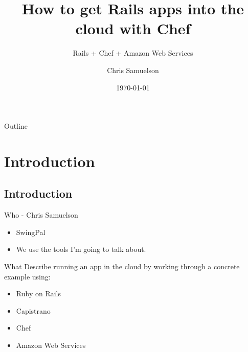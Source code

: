\documentclass{beamer}
\title %
{How to get Rails apps into the cloud with Chef}
\subtitle
{Rails + Chef + Amazon Web Services}
\author[@chrissamuelson] %
{Chris Samuelson}
\date %
{\today}
\begin{document}
\begin{frame}
  \titlepage
\end{frame}

\begin{frame}{Outline}
  \tableofcontents
\end{frame}





\section{Introduction}

\subsection{Introduction}

\begin{frame}{Who - Chris Samuelson}
  
  \begin{itemize}
  \item
    SwingPal
    \pause
  \item
    We use the tools I'm going to talk about.
  \end{itemize}
\end{frame}

\begin{frame}{What}
Describe running an app in the cloud by working through a concrete example using:
\pause
\begin{itemize}
  \item
    Ruby on Rails
    \pause
  \item
    Capistrano
    \pause
  \item
    Chef
    \pause
  \item
    Amazon Web Services
\end{itemize}
\end{frame}
\end{document}
